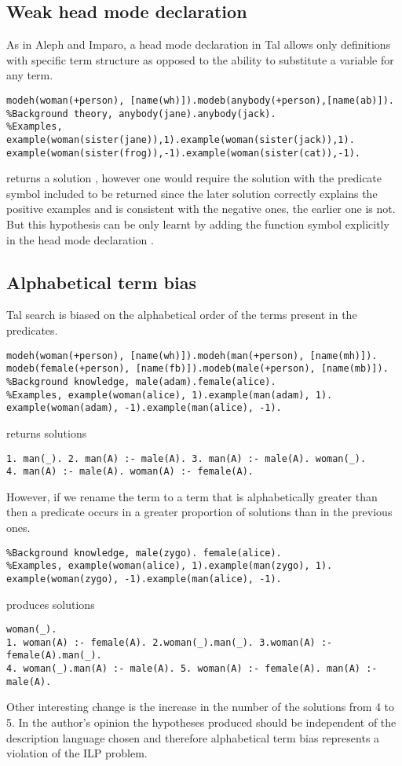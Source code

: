 \subsection{Weak head mode declaration}
As in Aleph and Imparo, a head mode declaration in Tal allows only definitions with specific term structure as opposed to the ability to substitute a variable for any term.
\begin{lstlisting}
modeh(woman(+person), [name(wh)]).modeb(anybody(+person),[name(ab)]).
%Background theory, anybody(jane).anybody(jack).
%Examples, example(woman(sister(jane)),1).example(woman(sister(jack)),1).
example(woman(sister(frog)),-1).example(woman(sister(cat)),-1).
\end{lstlisting}
returns a solution , however one would require the solution  with the predicate symbol  included to be returned since the later solution correctly explains the positive examples and is consistent with the negative ones, the earlier one is not. But this hypothesis can be only learnt by adding the function symbol  explicitly in the head mode declaration .

\subsection{Alphabetical term bias}
Tal search is biased on the alphabetical order of the terms present in the predicates.
\begin{lstlisting}
modeh(woman(+person), [name(wh)]).modeh(man(+person), [name(mh)]).
modeb(female(+person), [name(fb)]).modeb(male(+person), [name(mb)]).
%Background knowledge, male(adam).female(alice).
%Examples, example(woman(alice), 1).example(man(adam), 1).
example(woman(adam), -1).example(man(alice), -1).
\end{lstlisting}
returns solutions
\begin{lstlisting}
1. man(_). 2. man(A) :- male(A). 3. man(A) :- male(A). woman(_).
4. man(A) :- male(A). woman(A) :- female(A).
\end{lstlisting}
However, if we rename the term  to a term that is alphabetically greater than  then a predicate  occurs in a greater proportion of solutions than in the previous ones.
\begin{lstlisting}
%Background knowledge, male(zygo). female(alice).
%Examples, example(woman(alice), 1).example(man(zygo), 1).
example(woman(zygo), -1).example(man(alice), -1).
\end{lstlisting}
produces solutions
\begin{lstlisting}
woman(_).
1. woman(A) :- female(A). 2.woman(_).man(_). 3.woman(A) :- female(A).man(_).
4. woman(_).man(A) :- male(A). 5. woman(A) :- female(A). man(A) :- male(A).
\end{lstlisting}
Other interesting change is the increase in the number of the solutions from 4 to 5. In the author's opinion the hypotheses produced should be independent of the description language chosen and therefore alphabetical term bias represents a violation of the ILP problem.

